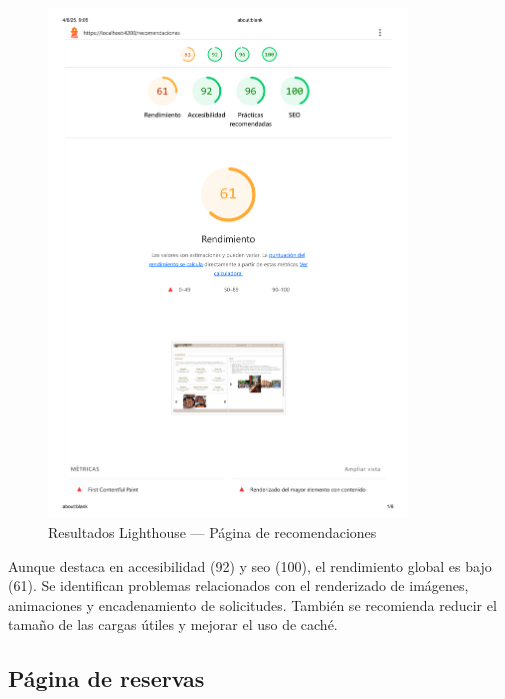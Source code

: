 \begin{figure}[h!tb]
  \centering
  \includegraphics[width=0.85\textwidth]{figs/recomendaciones_lighthouse.png}
  \caption{Resultados Lighthouse — Página de recomendaciones}
  \label{fig:lighthouse-recomendaciones}
\end{figure}

Aunque destaca en accesibilidad (92) y \gls{seo} (100), el rendimiento global es bajo (61). Se identifican problemas relacionados con el renderizado de imágenes, animaciones y encadenamiento de solicitudes. También se recomienda reducir el tamaño de las cargas útiles y mejorar el uso de caché.

\subsection*{Página de reservas}

